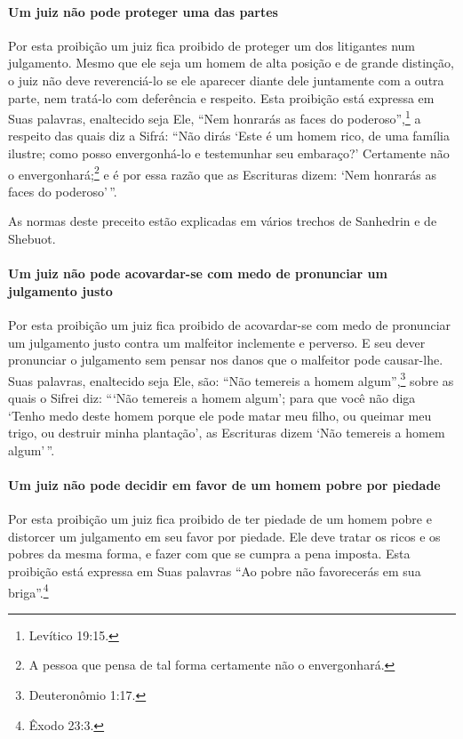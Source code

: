 \paragraph{Um juiz não pode proteger uma das partes}

Por esta proibição um juiz fica proibido de proteger um dos litigantes
num julgamento. Mesmo que ele seja um homem de alta posição e de grande
distinção, o juiz não deve reverenciá-lo se ele aparecer diante dele
juntamente com a outra parte, nem tratá-lo com deferência e respeito.
Esta proibição está expressa em Suas palavras, enaltecido seja Ele,
``Nem honrarás as faces do poderoso'',\footnote{Levítico 19:15.} a respeito das
quais diz a Sifrá: ``Não dirás `Este é um homem rico, de uma família
ilustre; como posso envergonhá-lo e testemunhar seu embaraço?'
Certamente não o envergonhará;\footnote{A pessoa que pensa de tal forma certamente não o envergonhará.} e é por essa razão
que as Escrituras dizem: `Nem honrarás as faces do poderoso'\,''.

As normas deste preceito estão explicadas em vários trechos de Sanhedrin e de Shebuot.

\paragraph{Um juiz não pode acovardar-se com medo de pronunciar um julgamento justo}

Por esta proibição um juiz fica proibido de acovardar-se com medo de
pronunciar um julgamento justo contra um malfeitor inclemente e
perverso. E seu dever pronunciar o julgamento sem pensar nos danos que
o malfeitor pode causar-lhe. Suas palavras, enaltecido seja Ele, são:
``Não temereis a homem algum'',\footnote{Deuteronômio 1:17.} sobre as quais o
Sifrei diz: ```Não temereis a homem algum'; para que você não diga
`Tenho medo deste homem porque ele pode matar meu filho, ou queimar meu
trigo, ou destruir minha plantação', as Escrituras dizem `Não temereis a
homem algum'\,''.

\paragraph{Um juiz não pode decidir em favor de um homem pobre por piedade}

Por esta proibição um juiz fica proibido de ter piedade de um homem
pobre e distorcer um julgamento em seu favor por piedade. Ele deve
tratar os ricos e os pobres da mesma forma, e fazer com que se cumpra a
pena imposta. Esta proibição está expressa em Suas palavras ``Ao pobre
não favorecerás em sua briga''.\footnote{Êxodo 23:3.}


